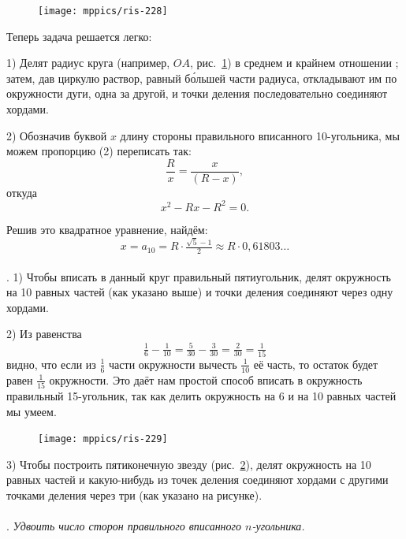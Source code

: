 \documentclass[twoside]{book}
\begin{document}
\begin{figure}
\centering
\texttt{[image: mppics/ris-228]}
\caption{}\label{1938/ris-228}
\end{figure}

Теперь задача решается легко:

1) Делят радиус круга (например, $OA$, рис.~\ref{1938/ris-228}) в среднем и крайнем отношении%
;
затем, дав циркулю раствор, равный б\'{о}льшей части радиуса, откладывают им по окружности дуги, одна за другой, и точки деления последовательно соединяют хордами.

2) Обозначив буквой $x$ длину стороны правильного вписанного 10-угольника, мы можем пропорцию (2) переписать так:
\[\frac Rx=\frac x{(R-x)},\]
откуда
\[x^2-Rx-R^2=0.\]

Решив это квадратное уравнение, найдём:
\[x=a_{10}=R\cdot\tfrac{\sqrt5-1}{2}\approx R \cdot  0{,}61803\dots\]

\paragraph{}\label{1938/223}
\mbox{.}
1) Чтобы вписать в данный круг правильный пятиугольник, делят окружность на 10 равных частей (как указано выше) и точки деления соединяют через одну хордами.

2) Из равенства
\[\tfrac16-\tfrac1{10}=\tfrac5{30}-\tfrac3{30}=\tfrac2{30}=\tfrac1{15}\]
видно, что если из $\tfrac16$ части окружности вычесть $\tfrac1{10}$ её часть, то остаток будет равен $\tfrac1{15}$ окружности.
Это даёт нам простой способ вписать в окружность правильный 15-угольник, так как делить окружность на 6 и на 10 равных частей мы умеем.

\begin{figure}
\centering
\texttt{[image: mppics/ris-229]}
\caption{}\label{1938/ris-229}
\end{figure}

3) Чтобы построить пятиконечную звезду (рис.~\ref{1938/ris-229}), делят окружность на 10 равных частей и какую-нибудь из точек деления соединяют хордами с другими точками деления через три (как указано на рисунке).

\paragraph{}\label{1938/224}
\mbox{.}
\emph{Удвоить число сторон правильного вписанного $n$-угольника.}
\end{document}
